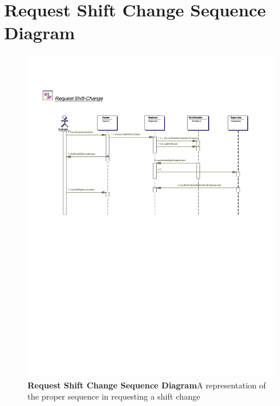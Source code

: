 \documentclass[letterpaper,12pt]{report}
\begin{document}
\section{Request Shift Change Sequence Diagram}
\begin{figure}[hbp]
 \includegraphics[trim=20mm 90mm 25mm 35mm]{diagrams/seq2.pdf}
 \caption{\small
\textbf{Request Shift Change Sequence Diagram}\newline A representation of the proper sequence in requesting a shift change}\label{fig:seq2}
\end{figure}
\newpage
\end{document}
